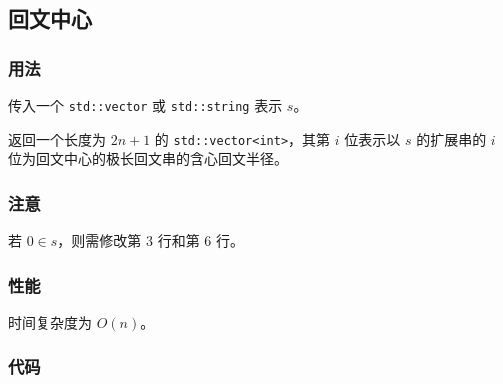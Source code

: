 \subsection{回文中心}

\subsubsection{用法}

传入一个 \lstinline{std::vector} 或 \lstinline{std::string} 表示 $s$。

返回一个长度为 $2n + 1$ 的 \lstinline{std::vector<int>}，其第 $i$ 位表示以 $s$ 的扩展串的 $i$ 位为回文中心的极长回文串的含心回文半径。

\subsubsection{注意}

若 $0 \in s$，则需修改第 3 行和第 6 行。

\subsubsection{性能}

时间复杂度为 $O(n)$。

\subsubsection{代码}


